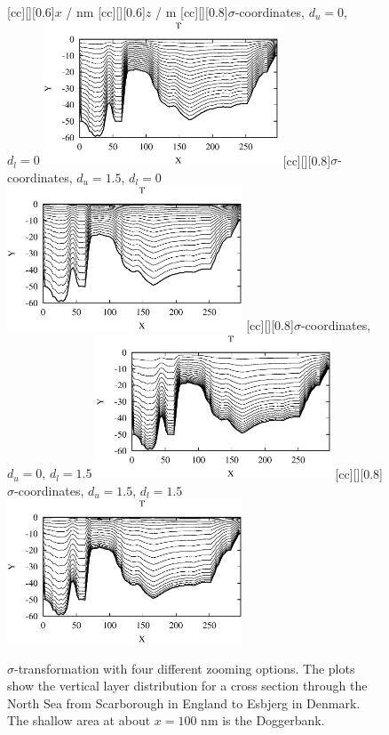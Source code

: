 \begin{figure}
\begin{center}
[cc][][0.6]{$x$ / nm}
[cc][][0.6]{$z$ / m}
[cc][][0.8]{$\sigma$-coordinates, $d_u=0$, $d_l=0$}
\includegraphics[width=7cm,bbllx=50,bblly=50,bburx=529,bbury=346]{./figures/sigma.ps}
[cc][][0.8]{$\sigma$-coordinates, $d_u=1.5$, $d_l=0$}
\includegraphics[width=7cm,bbllx=50,bblly=50,bburx=529,bbury=346]{./figures/beta10.ps}
[cc][][0.8]{$\sigma$-coordinates, $d_u=0$, $d_l=1.5$}
\includegraphics[width=7cm,bbllx=50,bblly=50,bburx=529,bbury=346]{./figures/beta01.ps}
[cc][][0.8]{$\sigma$-coordinates, $d_u=1.5$, $d_l=1.5$}
\includegraphics[width=7cm,bbllx=50,bblly=50,bburx=529,bbury=346]{./figures/beta11.ps}
\caption{
$\sigma$-transformation with four different zooming options. The plots
show the 
vertical layer distribution for a cross section through the North Sea
from Scarborough in England to Esbjerg in Denmark. The shallow area at
about $x=100$ nm is the Doggerbank. 
}\label{FigGeneral1}
\end{center}
\end{figure}

